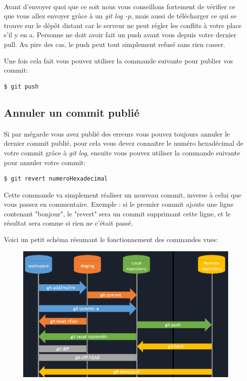 \documentclass[french, a4paper, 12pt, titlepage]{article}
\begin{document}
\paragraph{}Avant d'envoyer quoi que ce soit nous vous conseillons fortement de vérifier ce que vous allez envoyer grâce à un \emph{git log -p}, mais aussi de télécharger ce qui se trouve sur le dépôt distant car le serveur ne peut régler les conflits à votre place s’il y en a. Personne ne doit avoir fait un push avant vous depuis votre dernier pull. Au pire des cas, le push peut tout simplement refusé sans rien casser.

Une fois cela fait vous pouvez utiliser la commande suivante pour publier vos commit:
\begin{lstlisting}
$ git push
\end{lstlisting}

\subsection{Annuler un commit publié}
\paragraph{}Si par mégarde vous avez publié des erreurs vous pouvez toujours annuler le dernier commit publié, pour cela vous devez connaitre le numéro hexadécimal de votre commit grâce à \emph{git log}, ensuite vous pouvez utiliser la commande suivante pour annuler votre commit:
\begin{lstlisting}
$ git revert numeroHexadecimal
\end{lstlisting}
Cette commande va simplement réaliser un nouveau commit, inverse à celui que
vous passez en commentaire. Exemple : si le premier commit ajoute une ligne
contenant "bonjour", le "revert" sera un commit supprimant cette ligne, et le
résultat sera comme si rien ne c'était passé.

\newpage
Voici un petit schéma résumant le fonctionnement des commandes vues:
\begin{figure}[h]
\includegraphics[width=\textwidth]{DeroulementProtocoleGit}
\end{figure}
\end{document}
